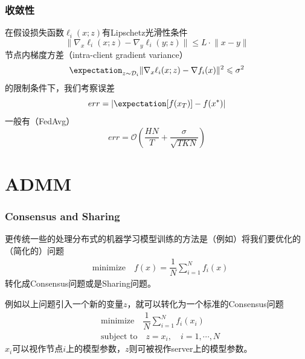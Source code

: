 
\begin{frame}
\frametitle{收敛性}

在假设损失函数$\ell_i(x;z)$有Lipschetz光滑性条件
$$\lVert \nabla_x \ell_i(x;z) - \nabla_y \ell_i(y;z) \rVert \leqslant L \cdot \lVert x-y \rVert$$
节点内梯度方差（intra-client gradient variance）
$$\expectation_{z \sim \mathcal{D}_i} \lVert \nabla_x \ell_i(x;z) - \nabla f_i(x) \rVert^2 \leqslant \sigma^2$$
的限制条件下，我们考察误差
$$err = | \expectation [f(x_T)] - f(x^*) |$$
一般有（FedAvg）
$$err = \mathcal{O} \left( \dfrac{HN}{T} + \dfrac{\sigma}{\sqrt{TKN}} \right)$$


\end{frame}


\section{ADMM}  %


\begin{frame}
\frametitle{Consensus and Sharing}

更传统一些的处理分布式的机器学习模型训练的方法是（例如\cite{boyd2011distributed}）将我们要优化的（简化的）问题
\begin{align*}
    & \text{minimize} \quad f(x) = \dfrac{1}{N} \sum\limits_{i=1}^N f_i(x)
\end{align*}
转化成Consensus问题或是Sharing问题。

\pause
\vspace{0.8em}

例如以上问题引入一个新的变量$z$，就可以转化为一个标准的Consensus问题
\begin{align*}
    & \text{minimize} \quad \dfrac{1}{N} \sum\limits_{i=1}^N f_i(x_i) \\
    & \text{subject to} \quad z = x_i, \quad i=1,\cdots,N
\end{align*}
$x_i$可以视作节点$i$上的模型参数，$z$则可被视作server上的模型参数。

\end{frame}

